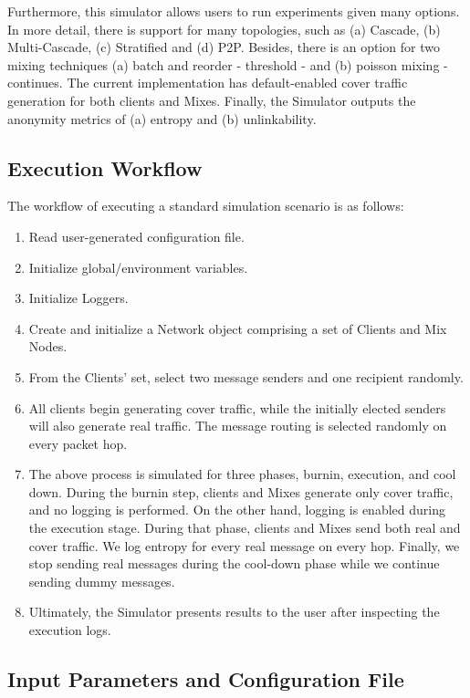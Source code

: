 \documentclass[logo,msc,cyber]{infthesis}   %
\begin{document}
Furthermore, this simulator allows users to run experiments given many options.
In more detail, there is support for many topologies, such as (a) Cascade, (b)
Multi-Cascade, (c) Stratified and (d) P2P. Besides, there is an option for two
mixing techniques (a) batch and reorder - threshold - and (b) poisson mixing
-continues. The current implementation has default-enabled cover traffic
generation for both clients and Mixes. Finally, the Simulator outputs the
anonymity metrics of (a) entropy and (b) unlinkability.

\subsection{Execution Workflow}

The workflow of executing a standard simulation scenario is as follows:

\begin{enumerate}
    \item Read user-generated configuration file.
    \item Initialize global/environment variables.
    \item Initialize Loggers.
    \item Create and initialize a Network object comprising a set of Clients and Mix Nodes.
    \item From the Clients' set, select two message senders and one recipient randomly.
    \item All clients begin generating cover traffic, while the initially
    elected senders will also generate real traffic. The message routing is
    selected randomly on every packet hop.
    \item The above process is simulated for three phases, burnin, execution,
    and cool down. During the burnin step, clients and Mixes generate only cover
    traffic, and no logging is performed. On the other hand, logging is enabled
    during the execution stage. During that phase, clients and Mixes send both
    real and cover traffic. We log entropy for every real message on every hop.
    Finally, we stop sending real messages during the cool-down phase while we
    continue sending dummy messages.
    \item Ultimately, the Simulator presents results to the user after
    inspecting the execution logs.
\end{enumerate}

\subsection{Input Parameters and Configuration File}
\end{document}
